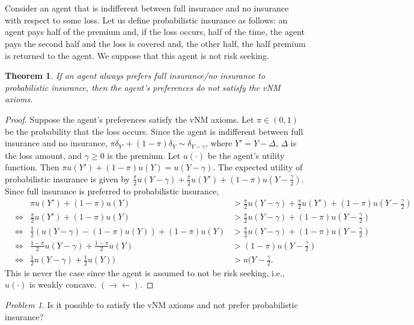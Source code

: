 \documentclass[12pt]{article}
\newtheorem{thm}{Theorem}[section]
\theoremstyle{definition}
\theoremstyle{remark}
\newtheorem{prob}{Problem}[section]
\def\contra{\rightarrow \leftarrow}
\begin{document}
\section{}
  Consider an agent that is indifferent between full insurance and no insurance with respect to some loss. Let us define probabilistic insurance as follows: an agent pays half of the premium and, if the loss occurs, half of the time, the agent pays the second half and the loss is covered and, the other half, the half premium is returned to the agent. We suppose that this agent is not risk seeking.
\begin{thm}
  If an agent always prefers full insurance/no insurance to probabilistic insurance, then the agent's preferences do not satisfy the vNM axioms.
\end{thm}
\begin{proof}
  Suppose the agent's preferences satisfy the vNM axioms. Let $\pi \in (0, 1)$ be the probability that the loss occurs. Since the agent is indifferent between full insurance and no insurance, $\pi \delta_{Y'} + (1 - \pi)\delta_Y \sim \delta_{Y-\gamma}$, where $Y' = Y - \Delta$, $\Delta$ is the loss amount, and $\gamma \geq 0$ is the premium. Let $u(\cdot)$ be the agent's utility function. Then $\pi u(Y') + (1 - \pi)u(Y) = u(Y - \gamma)$.
  The expected utility of probabilistic insurance is given by $\frac{\pi}{2}u(Y-\gamma) + \frac{\pi}{2}u(Y') + (1 - \pi)u(Y - \frac{\gamma}{2})$.
  Since full insurance is preferred to probabilistic insurance,
  \begin{align*}
    &      & \pi u(Y') + (1 - \pi)u(Y) &> \frac{\pi}{2}u(Y-\gamma) + \frac{\pi}{2}u(Y') + (1 - \pi)u(Y - \frac{\gamma}{2}) \\
    & \iff & \frac{\pi}{2} u(Y') + (1 - \pi)u(Y) &> \frac{\pi}{2}u(Y-\gamma) + (1 - \pi)u(Y - \frac{\gamma}{2}) \\
    & \iff & \frac{1}{2} (u(Y - \gamma) - (1 - \pi)u(Y)) + (1 - \pi)u(Y) &> \frac{\pi}{2}u(Y-\gamma) + (1 - \pi)u(Y - \frac{\gamma}{2}) \\
    & \iff & \frac{1 - \pi}{2} u(Y - \gamma) + \frac{1 - \pi}{2}u(Y) &> (1 - \pi)u(Y - \frac{\gamma}{2}) \\
    & \iff & \frac{1}{2} u(Y - \gamma) + \frac{1}{2}u(Y)) &> u(Y - \frac{\gamma}{2}.
  \end{align*}
  This is never the case since the agent is assumed to not be risk seeking, i.e., $u(\cdot)$ is weakly concave. $(\contra)$.
\end{proof}
\begin{prob}
  Is it possible to satisfy the vNM axioms and not prefer probabilistic insurance?
\end{prob}
\end{document}
